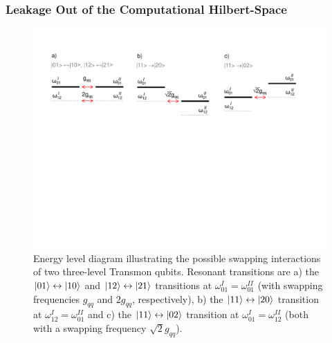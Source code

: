 \subsubsection{Leakage Out of the Computational Hilbert-Space}

\begin{figure}[ht!]
	\centering
	\includegraphics[width=\textwidth]{./material/figures/2-qubit-processor/swap_energy_levels}
	\caption{Energy level diagram illustrating the possible swapping interactions of two three-level Transmon qubits. Resonant transitions are a)  the $\left| 01 \right>\leftrightarrow\left| 10 \right>$ and $\left| 12 \right>\leftrightarrow\left| 21 \right>$ transitions at $\omega_{01}^I = \omega_{01}^{II}$ (with swapping frequencies $g_{qq}$ and $2g_{qq}$, respectively), b) the $\left| 11 \right>\leftrightarrow\left| 20 \right>$ transition at $\omega_{12}^{I} = \omega_{01}^{II}$ and c) the $\left| 11 \right>\leftrightarrow\left| 02 \right>$ transition at $\omega_{01}^I = \omega_{12}^{II}$ (both with a swapping frequency $\sqrt{2}g_{qq}$).}
	\label{fig:swap_energy_levels}
\end{figure}

\smallskip

